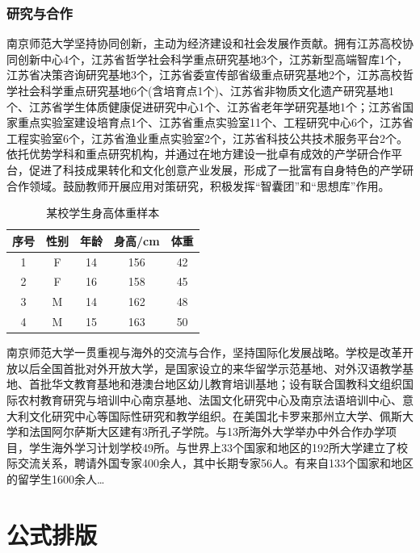 \documentclass[UTF8,a4paper,twoside,zihao=-4]{ctexrep}
\theoremstyle{nonumberplain}
\begin{document}
\subsection{研究与合作}
南京师范大学坚持协同创新，主动为经济建设和社会发展作贡献。拥有江苏高校协同创新中心4个，江苏省哲学社会科学重点研究基地3个，江苏新型高端智库1个，江苏省决策咨询研究基地3个，江苏省委宣传部省级重点研究基地2个，江苏高校哲学社会科学重点研究基地6个(含培育点1个)、江苏省非物质文化遗产研究基地1个、江苏省学生体质健康促进研究中心1个、江苏省老年学研究基地1个；江苏省国家重点实验室建设培育点1个、江苏省重点实验室11个、工程研究中心6个，江苏省工程实验室6个，江苏省渔业重点实验室2个，江苏省科技公共技术服务平台2个。依托优势学科和重点研究机构，并通过在地方建设一批卓有成效的产学研合作平台，促进了科技成果转化和文化创意产业发展，形成了一批富有自身特色的产学研合作领域。鼓励教师开展应用对策研究，积极发挥“智囊团”和“思想库”作用。
\begin{table}[htb]\caption{某校学生身高体重样本}\label{tb:hw}
\centering{}
\begin{tabular}{ccccc}
	\toprule
	序号 & 性别 & 年龄 & 身高/cm & 体重 \\
	\midrule
	1 & F & 14 & 156 &42 \\
	2 & F & 16 & 158 & 45 \\
	3 & M & 14 & 162 & 48 \\
	4 & M & 15 & 163 & 50 \\
	\bottomrule 
\end{tabular}
\end{table}

南京师范大学一贯重视与海外的交流与合作，坚持国际化发展战略。学校是改革开放以后全国首批对外开放大学，是国家设立的来华留学示范基地、对外汉语教学基地、首批华文教育基地和港澳台地区幼儿教育培训基地；设有联合国教科文组织国际农村教育研究与培训中心南京基地、法国文化研究中心及南京法语培训中心、意大利文化研究中心等国际性研究和教学组织。在美国北卡罗来那州立大学、佩斯大学和法国阿尔萨斯大区建有3所孔子学院。与13所海外大学举办中外合作办学项目，学生海外学习计划学校49所。与世界上33个国家和地区的192所大学建立了校际交流关系，聘请外国专家400余人，其中长期专家56人。有来自133个国家和地区的留学生1600余人\dots

\chapter{公式排版}
\end{document}
